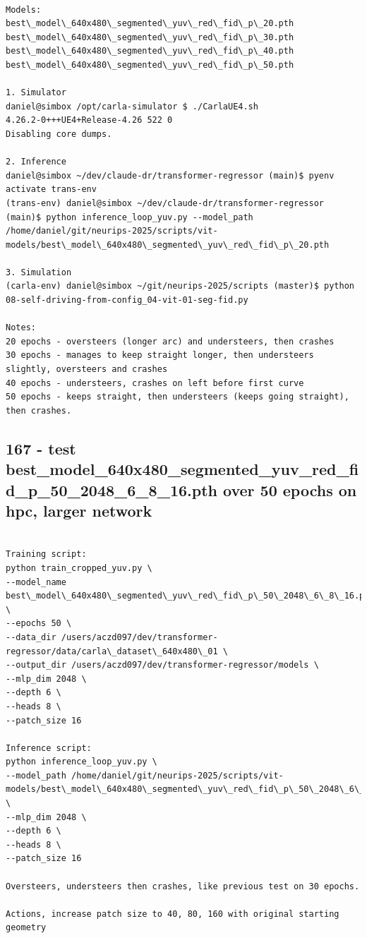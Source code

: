 \begin{verbatim}

Models:
best\_model\_640x480\_segmented\_yuv\_red\_fid\_p\_20.pth
best\_model\_640x480\_segmented\_yuv\_red\_fid\_p\_30.pth
best\_model\_640x480\_segmented\_yuv\_red\_fid\_p\_40.pth
best\_model\_640x480\_segmented\_yuv\_red\_fid\_p\_50.pth

1. Simulator
daniel@simbox /opt/carla-simulator $ ./CarlaUE4.sh 
4.26.2-0+++UE4+Release-4.26 522 0
Disabling core dumps.

2. Inference
daniel@simbox ~/dev/claude-dr/transformer-regressor (main)$ pyenv activate trans-env 
(trans-env) daniel@simbox ~/dev/claude-dr/transformer-regressor (main)$ python inference_loop_yuv.py --model_path /home/daniel/git/neurips-2025/scripts/vit-models/best\_model\_640x480\_segmented\_yuv\_red\_fid\_p\_20.pth

3. Simulation
(carla-env) daniel@simbox ~/git/neurips-2025/scripts (master)$ python 08-self-driving-from-config_04-vit-01-seg-fid.py

Notes:
20 epochs - oversteers (longer arc) and understeers, then crashes
30 epochs - manages to keep straight longer, then understeers slightly, oversteers and crashes
40 epochs - understeers, crashes on left before first curve
50 epochs - keeps straight, then understeers (keeps going straight), then crashes.

\end{verbatim}

\subsection{167 - test best\_model\_640x480\_segmented\_yuv\_red\_fid\_p\_50\_2048\_6\_8\_16.pth over 50 epochs on hpc, larger network}
\label{app_res:167}

\begin{verbatim}

Training script:
python train_cropped_yuv.py \
--model_name best\_model\_640x480\_segmented\_yuv\_red\_fid\_p\_50\_2048\_6\_8\_16.pth \
--epochs 50 \
--data_dir /users/aczd097/dev/transformer-regressor/data/carla\_dataset\_640x480\_01 \
--output_dir /users/aczd097/dev/transformer-regressor/models \
--mlp_dim 2048 \
--depth 6 \
--heads 8 \
--patch_size 16

Inference script:
python inference_loop_yuv.py \
--model_path /home/daniel/git/neurips-2025/scripts/vit-models/best\_model\_640x480\_segmented\_yuv\_red\_fid\_p\_50\_2048\_6\_8\_16.pth \
--mlp_dim 2048 \
--depth 6 \
--heads 8 \
--patch_size 16

Oversteers, understeers then crashes, like previous test on 30 epochs.

Actions, increase patch size to 40, 80, 160 with original starting geometry

\end{verbatim}
% 

